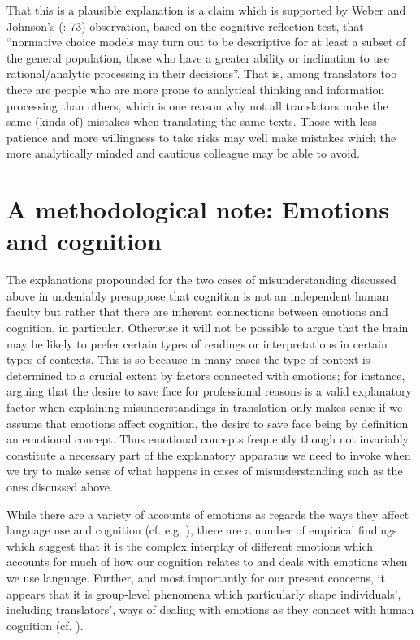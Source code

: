 \documentclass[output=paper]{LSP/langsci}
\begin{document}
  That this is a plausible explanation is a claim which is supported by Weber and Johnson's (\citeyear{Weber2009}: 73) observation, based on the cognitive reflection test, that ``normative choice models may turn out to be descriptive for at least a subset of the general population, those who have a greater ability or inclination to use rational/analytic processing in their decisions''. That is, among translators too there are people who are more prone to analytical thinking and information processing than others, which is one reason why not all translators make the same (kinds of) mistakes when translating the same texts. Those with less patience and more willingness to take risks may well make mistakes which the more analytically minded and cautious colleague may be able to avoid.

\section{A methodological note: Emotions and cognition}\label{hietaranta:sec:5}

The explanations propounded for the two cases of misunderstanding discussed above in  undeniably presuppose that cognition is not an independent human faculty but rather that there are inherent connections between emotions and cognition, in particular. Otherwise it will not be possible to argue that the brain may be likely to prefer certain types of readings or interpretations in certain types of contexts. This is so because in many cases the type of context is determined to a crucial extent by factors connected with emotions; for instance, arguing that the desire to save face for professional reasons is a valid explanatory factor when explaining misunderstandings in translation only makes sense if we assume that emotions affect cognition, the desire to save face being by definition an emotional concept. Thus emotional concepts frequently though not invariably constitute a necessary part of the explanatory apparatus we need to invoke when we try to make sense of what happens in cases of misunderstanding such as the ones discussed above.

While there are a variety of accounts of emotions as regards the ways they affect language use and cognition (cf. e.g. \citealt{Power2006}), there are a number of empirical findings which suggest that it is the complex interplay of different emotions which accounts for much of how our cognition relates to and deals with emotions when we use language. Further, and most importantly for our present concerns, it appears that it is group-level phenomena which particularly shape individuals', including translators', ways of dealing with emotions as they connect with human cognition (cf. \citealt{Kleef2016}).
\end{document}
